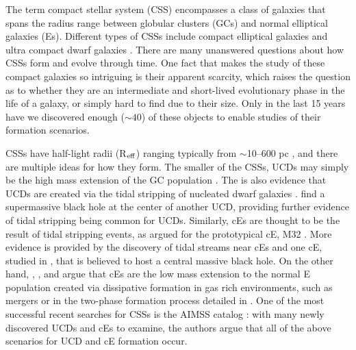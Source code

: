 \documentclass[iop,apj]{emulateapj}
\newcommand{\Reff}{R$_{\rm eff}$}
\begin{document}
\noindent The term compact stellar system (CSS) encompasses a class of galaxies that spans the radius range between globular clusters (GCs) and normal elliptical galaxies (Es). Different types of CSSs include compact elliptical galaxies \citep[cEs;][]{Faber1973} and ultra compact dwarf galaxies \citep[UCDs;][]{Phillipps2001}. There are many unanswered questions about how CSSs form and evolve through time. One fact that makes the study of these compact galaxies so intriguing is their apparent scarcity, which raises the question as to whether they are an intermediate and short-lived evolutionary phase in the life of a galaxy, or simply hard to find due to their size. Only in the last 15 years have we discovered enough ($\sim 40$) of these objects to enable studies of their formation scenarios.

CSSs have half-light radii (\Reff) ranging typically from $\sim$10--600 pc \citep[e.g.,][]{Norris2014}, and there are multiple ideas for how they form. The smaller of the CSSs, UCDs may simply be the high mass extension of the GC population \citep{Drinkwater2000, Mieske2002}. The is also evidence that UCDs are created via the tidal stripping of nucleated dwarf galaxies \citep{Bekki2001, Bekki2003, Jennings2015, Zhang2015}. \citet{Seth2014} find a supermassive black hole at the center of another UCD, providing further evidence of tidal stripping being common for UCDs. Similarly, cEs are thought to be the result of tidal stripping events, as argued for the prototypical cE, M32 \citep{Choi2002, Graham2002, Huxor2011}. More evidence is provided by the discovery of tidal streams near cEs \citep{SmithCastelli2008a,Chilingarian2009} and one cE, studied in \citet{Kormendy1997}, that is believed to host a central massive black hole. On the other hand, \citet{Wirth1984}, \citet{Kormendy2009}, and \citet{Kormendy2012a} argue that cEs are the low mass extension to the normal E population created via dissipative formation in gas rich environments, such as mergers or in the two-phase formation process detailed in \citet{Oser2010}. One of the most successful recent searches for CSSs is the AIMSS catalog \citep{Norris2014}: with many newly discovered UCDs and cEs to examine, the authors argue that all of the above scenarios for UCD and cE formation occur.
\end{document}
